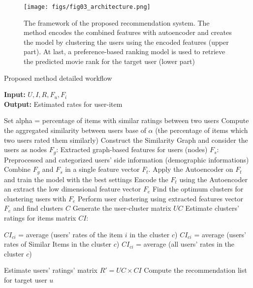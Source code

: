 \documentclass[a4paper,fleqn]{cas-dc}
\begin{document}
\begin{figure*}
	\centering
	\texttt{[image: figs/fig03\_architecture.png]}
	\caption{The framework of the proposed recommendation system. The method encodes the combined features with autoencoder and creates the model by clustering the users using the encoded features (upper part). At last, a preference-based ranking model is used to retrieve the predicted movie rank for the target user (lower part)}
	\label{FIG:03}
\end{figure*}

\begin{algorithm}
	\caption{Proposed method detailed workflow}
	\label{ALG:01}

	\hspace*{\algorithmicindent} \textbf{Input:} $U, I, R, F_u, F_i$ \\
	\hspace*{\algorithmicindent} \textbf{Output:} Estimated rates for user-item

	\begin{algorithmic}[1]

		\State Set alpha = percentage of items with similar ratings between two users
		\State Compute the aggregated similarity between users base of $\alpha$ (the percentage of items which two users rated them similarly)
		\State Construct the Similarity Graph and consider the users as nodes
		\State $F_g$: Extracted graph-based features for users (nodes)
		\State $F_s$: Preprocessed and categorized users' side information (demographic informations)
		\State Combine $F_g$ and $F_s$ in a single feature vector $F_t$.
		Apply the Autoencoder on $F_t$ and train the model with the best settings
		\State Encode the $F_t$ using the Autoencoder an extract the low dimensional feature vector $F_e$
		\State Find the optimum clusters for clustering users with $F_e$
		\State Perform user clustering using extracted features vector $F_e$ and find clusters $C$
		\State Generate the user-cluster matrix $UC$
		\State Estimate clusters' ratings for items matrix $CI$:

		\State $CI_{ci}$ = average (users' rates of the item $i$ in the cluster $c$)
		\State $CI_{ci}$ = average (users' rates of Similar Items in the cluster $c$)
		\Else
		\State $CI_{ci}$ = average (all users' rates in the cluster $c$)
		\EndIf



		\State Estimate users' ratings' matrix $R' = UC \times CI$
		\State Compute the recommendation list for target user $u$

	\end{algorithmic}


\end{algorithm}
\end{document}
